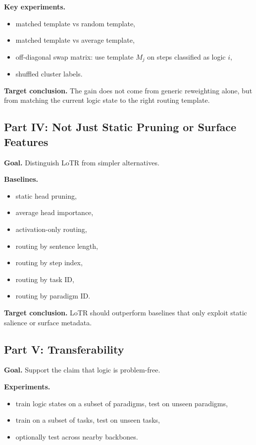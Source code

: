 \documentclass[11pt]{article}
\begin{document}
\textbf{Key experiments.}
\begin{itemize}[leftmargin=1.5em]
    \item matched template vs random template,
    \item matched template vs average template,
    \item off-diagonal swap matrix: use template $M_j$ on steps classified as logic $i$,
    \item shuffled cluster labels.
\end{itemize}

\textbf{Target conclusion.}
The gain does not come from generic reweighting alone, but from matching the current logic state to the right routing template.

\subsection{Part IV: Not Just Static Pruning or Surface Features}

\textbf{Goal.} Distinguish LoTR from simpler alternatives.

\textbf{Baselines.}
\begin{itemize}[leftmargin=1.5em]
    \item static head pruning,
    \item average head importance,
    \item activation-only routing,
    \item routing by sentence length,
    \item routing by step index,
    \item routing by task ID,
    \item routing by paradigm ID.
\end{itemize}

\textbf{Target conclusion.}
LoTR should outperform baselines that only exploit static salience or surface metadata.

\subsection{Part V: Transferability}

\textbf{Goal.} Support the claim that logic is problem-free.

\textbf{Experiments.}
\begin{itemize}[leftmargin=1.5em]
    \item train logic states on a subset of paradigms, test on unseen paradigms,
    \item train on a subset of tasks, test on unseen tasks,
    \item optionally test across nearby backbones.
\end{itemize}
\end{document}
